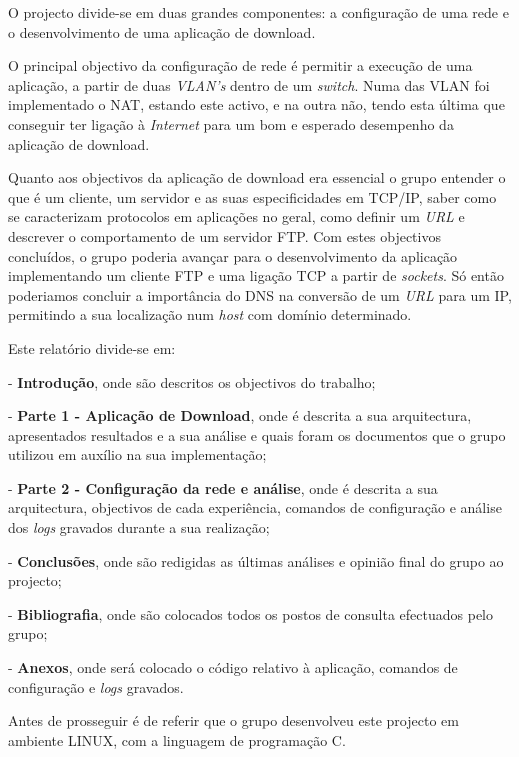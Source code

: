 \documentclass[a4paper]{article}
\begin{document}
O projecto divide-se em duas grandes componentes: a configuração de uma rede e o desenvolvimento de uma aplicação de download.\linebreak

O principal objectivo da configuração de rede é permitir a execução de uma aplicação, a partir de duas \textit{VLAN's} dentro de um \textit{switch}. Numa das VLAN foi implementado o NAT, estando este activo, e na outra não, tendo esta última que conseguir ter ligação à \textit{Internet} para um bom e esperado desempenho da aplicação de download.

Quanto aos objectivos da aplicação de download era essencial o grupo entender o que é um cliente, um servidor e as suas especificidades em TCP/IP, saber como se caracterizam protocolos em aplicações no geral, como definir um \textit{URL} e descrever o comportamento de um servidor FTP. Com estes objectivos concluídos, o grupo poderia avançar para o desenvolvimento da aplicação implementando um cliente FTP e uma ligação TCP a partir de \textit{sockets}. Só então poderiamos concluir a importância do DNS na conversão de um \textit{URL} para um IP, permitindo a sua localização num \textit{host} com domínio determinado.\linebreak

Este relatório divide-se em:

- \textbf{Introdução}, onde são descritos os objectivos do trabalho;

- \textbf{Parte 1 - Aplicação de Download}, onde é descrita a sua arquitectura, apresentados resultados e a sua análise e quais foram os documentos que o grupo utilizou em auxílio na sua implementação;

- \textbf{Parte 2 - Configuração da rede e análise}, onde é descrita a sua arquitectura, objectivos de cada experiência, comandos de configuração e análise dos \textit{logs} gravados durante a sua realização;

- \textbf{Conclusões}, onde são redigidas as últimas análises e opinião final do grupo ao projecto;

- \textbf{Bibliografia}, onde são colocados todos os postos de consulta efectuados pelo grupo;

- \textbf{Anexos}, onde será colocado o código relativo à aplicação, comandos de configuração e \textit{logs} gravados.\linebreak

Antes de prosseguir é de referir que o grupo desenvolveu este projecto em ambiente LINUX, com a linguagem de programação C.
\end{document}
